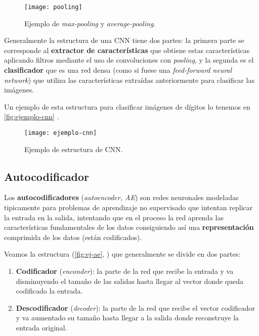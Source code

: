 \begin{figure}[htpb]
  \centering
  \texttt{[image: pooling]}
  \caption{Ejemplo de \emph{max-pooling} y \emph{average-pooling}.}
  \label{fig:pooling}
\end{figure}

Generalmente la estructura de una CNN tiene dos partes: la primera parte se corresponde al \textbf{extractor de características} que obtiene estas características aplicando filtros mediante el uso de convoluciones con \emph{pooling}, y la segunda es el \textbf{clasificador} que es una red densa (como si fuese una \emph{feed-forward neural network}) que utiliza las características extraídas anteriormente para clasificar las imágenes.

Un ejemplo de esta estructura para clasificar imágenes de dígitos lo tenemos en \autoref{fig:ejemplo-cnn} \cite{saha2018cnn}.

\begin{figure}[htpb]
  \centering
  \texttt{[image: ejemplo-cnn]}
  \caption{Ejemplo de estructura de CNN.}
  \label{fig:ejemplo-cnn}
\end{figure}

\subsection{Autocodificador}\label{sec:autoencoder}

Los \textbf{autocodificadores} (\emph{autoencoder, AE}) \cite{mcclelland1986parallel} son redes neuronales modeladas tipicamente para problemas de aprendizaje no supervisado que intentan replicar la entrada en la salida, intentando que en el proceso la red aprenda las características fundamentales de los datos consiguiendo así una \textbf{representación} comprimida de los datos (están codificados).

Veamos la estructura (\autoref{fig:ej-ae}, \cite{sancho2020ae}) que generalmente se divide en dos partes:

\begin{enumerate}
  \item \textbf{Codificador} (\emph{enconder}): la parte de la red que recibe la entrada y va disminuyendo el tamaño de las salidas hasta llegar al vector donde queda codificado la entrada.
  \item \textbf{Descodificador} (\emph{decoder}): la parte de la red que recibe el vector codificador y va aumentado su tamaño hasta llegar a la salida donde reconstruye la entrada original.
\end{enumerate}

